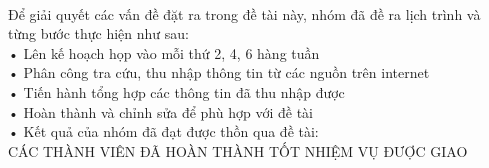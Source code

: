 \documentclass{report}
\newcommand\tab[1][1.25cm]{\hspace*{#1}}
\begin{document}
\paragraph{}
    Để giải quyết các vấn đề đặt ra trong đề tài này, nhóm đã đề ra lịch trình và từng bước thực hiện như sau:\\\tab
    •	Lên kế hoạch họp vào mỗi thứ 2, 4, 6 hàng tuần\\\tab
    •	Phân công tra cứu, thu nhập thông tin từ các nguồn trên internet\\\tab
    •	Tiến hành tổng hợp các thông tin đã thu nhập được\\\tab
    •	Hoàn thành và chỉnh sửa để phù hợp với đề tài\\\tab
    •	Kết quả của nhóm đã đạt được thồn qua đề tài:\\
    \tab\tab CÁC THÀNH VIÊN ĐÃ HOÀN THÀNH TỐT NHIỆM VỤ ĐƯỢC GIAO
\pagebreak

\end{document}

